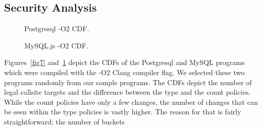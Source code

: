 \subsection{Security Analysis}
\label{RQ5: Security Analysis}

\begin{figure}[h] 
  \begin{minipage}[b]{0.5\linewidth}
    \centering
    \resizebox{1.04\columnwidth}{!}{}
    \caption{Postgresql -O2 CDF.} 
    \label{fig7} 
    \vspace{1ex}
  \end{minipage}%
  \begin{minipage}[b]{0.5\linewidth}
    \centering
    \resizebox{1.04\columnwidth}{!}{} 
    \caption{MySQL.js -O2 CDF.} 
    \label{fig8} 
    \vspace{1ex}
  \end{minipage} 
\end{figure}
Figures~\ref{fig7} and~\ref{fig8}
depict the CDFs of the Postgresql and MySQL programs which were compiled with the -O2 Clang compiler flag. 
We selected these two programs randomly from our sample programs. 
The CDFs depict the number of legal callsite targets and the difference between the type and the count policies. 
While the count  policies have only a few changes, the number of changes that can be seen within the 
type policies is vastly higher. The reason for that is fairly straightforward: the number of buckets 
